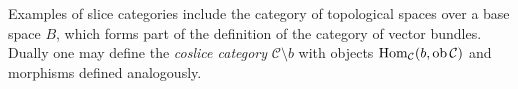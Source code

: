 \documentclass[a4paper,openany]{scrbook}
\renewcommand{\C}{\mathcal C}
\begin{document}
\begin{example}
\begin{enumerate}[label=(\alph*)]
\begin{center}
\end{center}
Examples of slice categories include the category of topological spaces over a base space $B$, which forms part of the definition of the category of vector bundles. Dually one may define the \emph{coslice category} $\C \setminus b$ with objects $\Hom_{\C}(b, \ob \C)$ and morphisms defined analogously. 
\end{enumerate}
\end{example}
\end{document}
